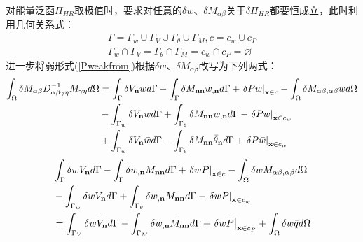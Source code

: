 对能量泛函$\Pi_{H\!R}$取极值时，要求对任意的$\delta w$、$\delta M_{\alpha\beta}$关于$\delta\Pi_{H\!R}$都要恒成立，此时利用几何关系式：
\begin{equation}
    \begin{split}
    \Gamma=\Gamma_w\cup\Gamma_V\cup\Gamma_{\theta}\cup\Gamma_M,c=c_w\cup c_P\\
    \Gamma_w\cap\Gamma_V=\Gamma_{\theta}\cap\Gamma_M=c_w\cap c_P=\varnothing
\end{split}
\end{equation}
进一步将弱形式(\ref{Pweakfrom})根据$\delta w$、$\delta M_{\alpha\beta}$改写为下列两式：
\begin{equation}\label{Pweakform1}
    \begin{split}
        \int_\Omega {\delta {M_{\alpha \beta }}D_{\alpha \beta \gamma \eta }^{ - 1}{M_{\gamma \eta }}d\Omega }&=\int_\Gamma  {\delta {V_{\bf{n}}}wd\Gamma }  - \int_\Gamma  {\delta {M_{{\bf{nn}}}}{w_{,{\bf{n}}}}d\Gamma }+{\left. {\delta Pw} \right|_{{\bf{x}} \in c}} - \int_\Omega  {\delta {M_{\alpha \beta ,\alpha \beta }}wd\Omega } \\
        &-\int_{{\Gamma _w}} {\delta {V_{\bf{n}}}wd\Gamma }  + \int_{{\Gamma _\theta }} {\delta {M_{{\bf{nn}}}}{w_{,{\bf{n}}}}d\Gamma }  - {\left. {\delta Pw} \right|_{{\bf{x}} \in {c_w}}}\\
        &+\int_{{\Gamma _w}} {\delta {V_{\bf{n}}}\bar wd\Gamma }  - \int_{{\Gamma _\theta }} {\delta {M_{{\bf{nn}}}}{{\bar \theta }_{\bf{n}}}d\Gamma }  + {\left. {\delta P\bar w} \right|_{{\bf{x}} \in {c_w}}}
    \end{split}
\end{equation}
\begin{equation}
        \begin{split}\label{Pweakform2}
            &\int_\Gamma  {\delta w{V_{\bf{n}}}d\Gamma } - \int_\Gamma  {\delta {w_{,{\bf{n}}}}{M_{{\bf{nn}}}}d\Gamma }  + {\left. {\delta wP} \right|_{{\bf{x}} \in c}} - \int_\Omega  {\delta w{M_{\alpha \beta ,\alpha\beta}}d\Omega }\\
            &- \int_{{\Gamma _w}} {\delta w{V_{\bf{n}}}d\Gamma }  + \int_{{\Gamma _\theta }} {\delta {w_{,{\bf{n}}}}{M_{{\bf{nn}}}}d\Gamma }  - {\left. {\delta wP} \right|_{{\bf{x}} \in {c_w}}}\\
            &= \int_{{\Gamma _V}} {\delta w{{\bar V}_{\bf{n}}}d\Gamma }  - \int_{{\Gamma _M}} {\delta {w_{,{\bf{n}}}}{{\bar M}_{{\bf{nn}}}}d\Gamma }  + {\left. {\delta w\bar P} \right|_{{\bf{x}} \in {c_P}}} + \int_\Omega  {\delta w\bar qd\Omega} 
    \end{split}
\end{equation} 
